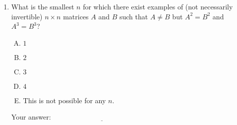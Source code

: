 \documentclass[10pt]{amsart}
\begin{document}
\begin{enumerate}
\item What is the smallest $n$ for which there exist examples of (not
  necessarily invertible) $n \times n$ matrices $A$ and $B$ such that
  $A \ne B$ but $A^2 = B^2$ and $A^3 = B^3$?

  \begin{enumerate}[(A)]
  \item $1$
  \item $2$
  \item $3$
  \item $4$
  \item This is not possible for any $n$.
  \end{enumerate}

  \vspace{0.1in}
  Your answer: $\underline{\qquad\qquad\qquad\qquad\qquad\qquad\qquad}$
  \vspace{0.1in}

\end{enumerate}
\end{document}
